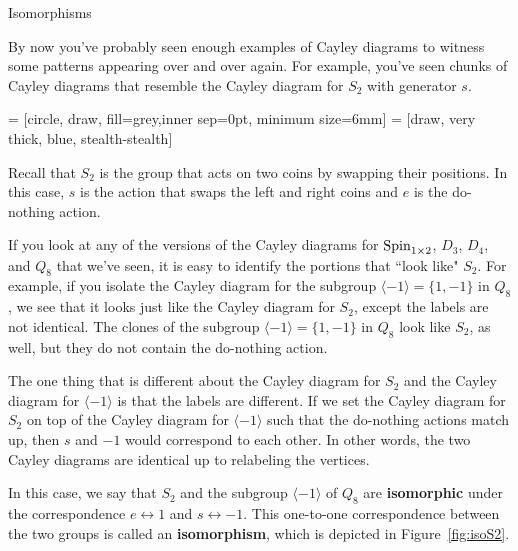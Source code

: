 \begin{section}{Isomorphisms}

By now you've probably seen enough examples of Cayley diagrams to witness some patterns appearing over and over again.  For example, you've seen chunks of Cayley diagrams that resemble the Cayley diagram for $S_2$ with generator $s$.

 = [circle, draw, fill=grey,inner sep=0pt, minimum size=6mm]
 = [draw, very thick, blue, stealth-stealth]

\begin{center}
\end{center}

\noindent Recall that $S_2$ is the group that acts on two coins by swapping their positions.  In this case, $s$ is the action that swaps the left and right coins and $e$ is the do-nothing action.  

If you look at any of the versions of the Cayley diagrams for $\operatorname{Spin}_{1\times 2}$, $D_3$, $D_4$, and $Q_8$ that we've seen, it is easy to identify the portions that ``look like" $S_2$.  For example, if you isolate the Cayley diagram for the subgroup $\langle -1\rangle=\{1,-1\}$ in $Q_8$, we see that it looks just like the Cayley diagram for $S_2$, except the labels are not identical.  The clones of the subgroup $\langle -1\rangle=\{1,-1\}$ in $Q_8$ look like $S_2$, as well, but they do not contain the do-nothing action.  

The one thing that is different about the Cayley diagram for $S_2$ and the Cayley diagram for $\langle -1\rangle$ is that the labels are different.  If we set the Cayley diagram for $S_2$ on top of the Cayley diagram for $\langle -1\rangle$ such that the do-nothing actions match up, then $s$ and $-1$ would correspond to each other.  In other words, the two Cayley diagrams are identical up to relabeling the vertices.

In this case, we say that $S_2$ and the subgroup $\langle -1\rangle$ of $Q_8$ are \textbf{isomorphic} under the correspondence $e\leftrightarrow 1$ and $s\leftrightarrow -1$.  This one-to-one correspondence between the two groups is called an \textbf{isomorphism}, which is depicted in Figure~\ref{fig:isoS2}.
  

\end{section}

